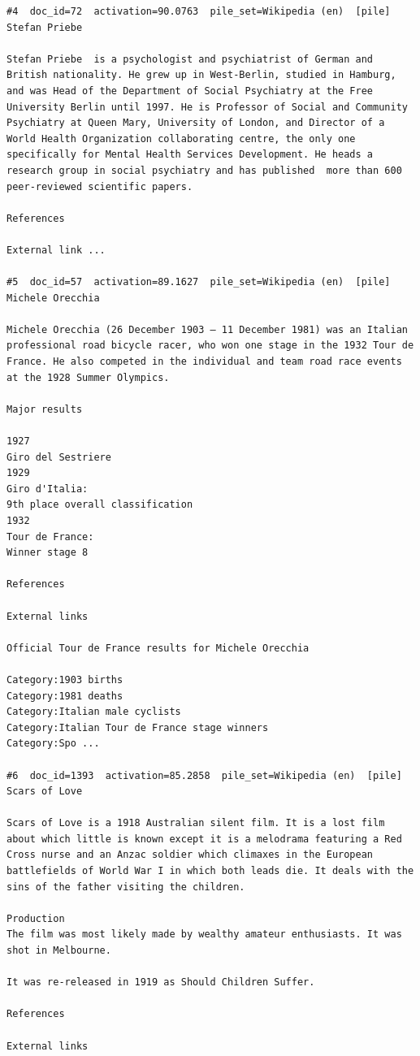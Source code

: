 \begin{verbatim}
#4  doc_id=72  activation=90.0763  pile_set=Wikipedia (en)  [pile]
Stefan Priebe

Stefan Priebe  is a psychologist and psychiatrist of German and British nationality. He grew up in West-Berlin, studied in Hamburg, and was Head of the Department of Social Psychiatry at the Free University Berlin until 1997. He is Professor of Social and Community Psychiatry at Queen Mary, University of London, and Director of a World Health Organization collaborating centre, the only one specifically for Mental Health Services Development. He heads a research group in social psychiatry and has published  more than 600 peer-reviewed scientific papers.

References

External link ...

#5  doc_id=57  activation=89.1627  pile_set=Wikipedia (en)  [pile]
Michele Orecchia

Michele Orecchia (26 December 1903 – 11 December 1981) was an Italian professional road bicycle racer, who won one stage in the 1932 Tour de France. He also competed in the individual and team road race events at the 1928 Summer Olympics.

Major results

1927
Giro del Sestriere
1929
Giro d'Italia:
9th place overall classification
1932
Tour de France:
Winner stage 8

References

External links

Official Tour de France results for Michele Orecchia

Category:1903 births
Category:1981 deaths
Category:Italian male cyclists
Category:Italian Tour de France stage winners
Category:Spo ...

#6  doc_id=1393  activation=85.2858  pile_set=Wikipedia (en)  [pile]
Scars of Love

Scars of Love is a 1918 Australian silent film. It is a lost film about which little is known except it is a melodrama featuring a Red Cross nurse and an Anzac soldier which climaxes in the European battlefields of World War I in which both leads die. It deals with the sins of the father visiting the children.

Production
The film was most likely made by wealthy amateur enthusiasts. It was shot in Melbourne.

It was re-released in 1919 as Should Children Suffer.

References

External links


\end{verbatim}
